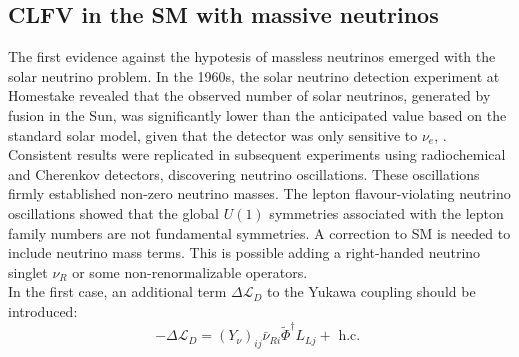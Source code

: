 \subsection{CLFV in the SM with massive neutrinos}\label{massiveneutrinos}
The first evidence against the hypotesis of massless neutrinos emerged with the solar neutrino problem. In the 1960s, the solar neutrino detection experiment at Homestake revealed that the observed number of solar neutrinos, generated by fusion in the Sun, was significantly lower than the anticipated value based on the standard solar model, given that the detector was only sensitive to $\nu_e$, \cite{PhysRevLett.20.1205}. Consistent results were replicated in subsequent experiments using radiochemical and Cherenkov detectors, discovering neutrino oscillations. These oscillations firmly established non-zero neutrino masses. The lepton flavour-violating neutrino oscillations showed that the global $U(1)$ symmetries associated with the lepton family numbers are not fundamental symmetries. A correction to SM is needed to include neutrino mass terms. This is possible adding a right-handed neutrino singlet $\nu_R$ or some non-renormalizable operators.
\\
In the first case, an additional term $\Delta \mathscr{L}_D$ to the Yukawa coupling should be introduced:
\begin{equation}
-\Delta \mathscr{L}_D=\left(Y_\nu\right)_{i j} \bar{\nu}_{R i}  \widetilde{\Phi}^\dagger L_{Lj}+\text { h.c. }
\end{equation}

